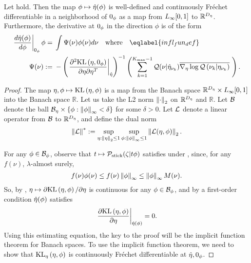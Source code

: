 \begin{thm}
%
Let  hold. Then the map $\phi \mapsto
\hat\eta(\phi)$ is well-defined and continuously Fr{\'e}chet differentiable in a
neighborhood of $0_\phi$ as a map from ${L_{\infty}[0,1]}$ to $\mathbb{R}^{D_{\eta}}$.
Furthermore, the derivative at $0_\phi$ in the direction $\phi$ is of the form
%
\begin{align}
%
\fracat{d \etaopt(\phi)}{d\phi}{\phiz} \phi ={}&
    \int \infl(\nu) \phi(\nu) d\nu \mathtxt{where} \eqlabel{infl_fun_def}\\
%
\infl(\nu) :={}&
-\left(\fracat{\partial^2 \KL{\eta, \phiz}}
                {\partial \eta \partial \eta^T}
                {\etaopt}\right)^{-1}
\left(
    \sumkm
    \q(\nu \vert \etaoptnuk) \lqgradbar{\nuk \vert \etanuk}
\right). \nonumber
%
\end{align}
%

%

\begin{proof}
%
The map $\eta, \phi \mapsto \mathrm{KL}\left(\eta, \phi\right)$ is a map from the Banach space
$\mathbb{R}^{D_{\eta}} \times {L_{\infty}[0,1]}$ into the Banach space $\mathbb{R}$. Let us
take the L2 norm $\left\Vert\cdot\right\Vert_2$ on $\mathbb{R}^{{D_{\eta}}}$ and $\mathbb{R}$.
Let $\mathcal{B}$ denote the ball $\mathcal{B}_\eta \times \{ \phi: \left\Vert\phi\right\Vert_{\infty} <
\delta\}$ for some $\delta > 0$.  Let $\mathcal{L}$ denote a linear operator from
$\mathcal{B}$ to $\mathbb{R}^{D_{\eta}}$, and define the dual norm
%
\begin{align*}
%
\norm{\linop}^* :=
    \sup_{\eta: \norm{\eta}_2 \le 1} \sup_{\phi: \norminf{\phi} \le 1}
     \norm{\linop(\eta, \phi)}_2.
%
\end{align*}

For any $\phi \in \mathcal{B}_\phi$, observe that $t \mapsto \mathcal{P}_{\mathrm{stick}}(\zeta \vert t
\phi)$ satisfies  under ,
since, for any $f(\nu)$, $\lambda$-almost surely,
%
\begin{align*}
%
f(\nu) \phi(\nu) \le f(\nu) \norminf{\phi} \le \norminf{\phi} M(\nu).
%
\end{align*}
%
So, by , $\eta \mapsto \partial \mathrm{KL}\left(\eta, \phi\right) /
\partial \eta$ is continuous for any $\phi \in \mathcal{B}_\phi$, and by a first-order
condition $\hat\eta(\phi)$ satisfies
%
\begin{align*}
%
\fracat{\partial \KL{\eta, \phi}}
                {\partial \eta}
                {\etaopt(\phi)} = 0.
%
\end{align*}
%
Using this estimating equation, the key to the proof will be the implicit
function theorem for Banach spaces. To use the implicit function theorem, we
need to show that $\mathrm{KL}_{\eta}\left(\eta, \phi\right)$ is continuously Fr{\'e}chet
differentiable at $\hat\eta, 0_\phi$.


\end{proof}
\end{thm}
